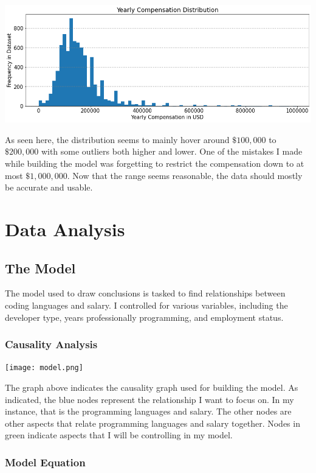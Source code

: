 \documentclass{report}
\begin{document}
\vspace{0.5in}

\includegraphics[width=0.9\linewidth]{frequencyConvertedCompYearly.png}

\vspace{0.5in}

As seen here, the distribution seems to mainly hover around $\$100,000$ to $\$200,000$ with some outliers both higher and lower. One of the mistakes I made while building the model was forgetting to restrict the compensation down to at most $\$1,000,000$. Now that the range seems reasonable, the data should mostly be accurate and usable.


\chapter{Data Analysis}

\section{The Model}

The model used to draw conclusions is tasked to find relationships between coding languages and salary. I controlled for various variables, including the developer type, years professionally programming, and employment status.

\subsection{Causality Analysis}

\texttt{[image: model.png]}

The graph above indicates the causality graph used for building the model. As indicated, the blue nodes represent the relationship I want to focus on. In my instance, that is the programming languages and salary. The other nodes are other aspects that relate programming languages and salary together. Nodes in green indicate aspects that I will be controlling in my model.

\subsection{Model Equation}
\end{document}

